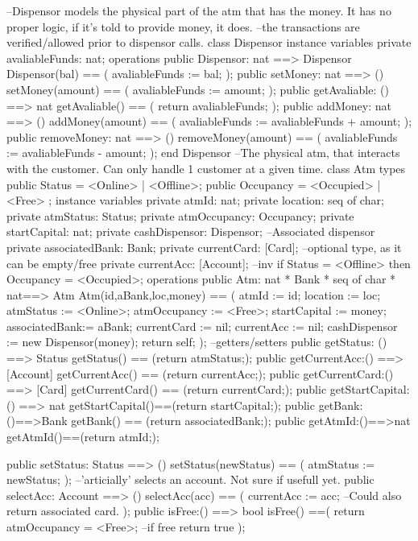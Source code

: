 \documentclass[a4paper]{article}
\begin{document}
\title{}
\author{}
\begin{vdm_al}
--Dispensor models the physical part of the atm that has the money. It has no proper logic, if it's told to provide money, it does.
--the transactions are verified/allowed prior to dispensor calls.
class Dispensor 
instance variables
    private avaliableFunds: nat;
operations
    public Dispensor: nat ==> Dispensor
    Dispensor(bal) == (
        avaliableFunds := bal;
    );
    public setMoney: nat ==> ()
    setMoney(amount) == (
        avaliableFunds := amount;
    ); 
    public getAvaliable: () ==> nat
    getAvaliable() == (
        return avaliableFunds;
    );
    public addMoney: nat ==> () 
    addMoney(amount) == (
        avaliableFunds := avaliableFunds + amount;
    );
    public removeMoney: nat ==> ()
    removeMoney(amount) == (
        avaliableFunds := avaliableFunds - amount;
    );
end Dispensor
--The physical atm, that interacts with the customer. Can only handle 1 customer at a given time. 
class Atm
types
    public Status = <Online> | <Offline>;
    public Occupancy = <Occupied> | <Free> ;
instance variables
    private atmId: nat;
    private location: seq of char;
    private atmStatus: Status;
    private atmOccupancy: Occupancy;
    private startCapital: nat;
    private cashDispensor: Dispensor; --Associated dispensor
    private associatedBank: Bank;
    private currentCard: [Card]; --optional type, as it can be empty/free
    private currentAcc: [Account];
    --inv if Status = <Offline> then Occupancy = <Occupied>;
operations
    public Atm: nat * Bank * seq of char * nat==> Atm
    Atm(id,aBank,loc,money) == (
        atmId := id;
        location := loc;
        atmStatus := <Online>;
        atmOccupancy := <Free>;
        startCapital := money;
        associatedBank:= aBank;
        currentCard := nil;
        currentAcc := nil;
        cashDispensor := new Dispensor(money);
        return self;
    );
    --getters/setters
    public getStatus: () ==> Status
    getStatus() == (return atmStatus;);
    public getCurrentAcc:() ==> [Account]
    getCurrentAcc() == (return currentAcc;);
    public getCurrentCard:() ==> [Card]
    getCurrentCard() == (return currentCard;);
    public getStartCapital:() ==> nat
    getStartCapital()==(return startCapital;);
    public getBank:()==>Bank
    getBank() == (return associatedBank;);
    public getAtmId:()==>nat
    getAtmId()==(return atmId;);

    public setStatus: Status ==> ()
    setStatus(newStatus) == (
        atmStatus := newStatus;
    );
    --'articially' selects an account. Not sure if usefull yet. 
    public selectAcc: Account ==> ()
    selectAcc(acc) == (
        currentAcc := acc;
        --Could also return associated card.
    );
    public isFree:() ==> bool
    isFree() ==(
        return atmOccupancy = <Free>; --if free return true
    );


\end{vdm_al}
\end{document}
